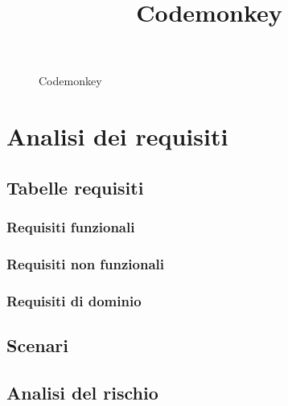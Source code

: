 \documentclass{article}
\title{Codemonkey}
\begin{document}
\begin{figure}[!ht]
   \centering
   \begin{titlepage}
      \huge Codemonkey
   \end{titlepage}
   \label{fig:nome-etichetta}
\end{figure}

\renewcommand{\contentsname}{Sommario}





\tableofcontents
\pagebreak





\section{Analisi dei requisiti}



\subsection {Tabelle requisiti}
\subsubsection{Requisiti funzionali}

\subsubsection{Requisiti non funzionali}

\subsubsection{Requisiti di dominio}


\subsection{Scenari}


\subsection {Analisi del rischio}
\end{document}
